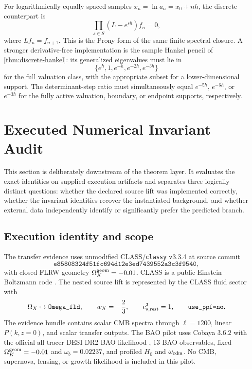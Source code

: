 \documentclass[aps,prd,preprint,onecolumn,nofootinbib,superscriptaddress,showkeys]{revtex4-2}
\numberwithin{equation}{section}
\theoremstyle{definition}
\theoremstyle{plain}
\begin{document}
For logarithmically equally spaced samples \(x_n=\ln a_n=x_0+nh\), the discrete counterpart is
\begin{equation}
\prod_{s\in S}(L-e^{sh})f_n=0,
\end{equation}
where \(Lf_n=f_{n+1}\).  This is the Prony form of the same finite spectral closure.  A stronger derivative-free implementation is the sample Hankel pencil of \cref{thm:discrete-hankel}: its generalized eigenvalues must lie in
\begin{equation}
\{e^{h},1,e^{-h},e^{-2h},e^{-3h}\}
\end{equation}
for the full valuation class, with the appropriate subset for a lower-dimensional support.  The determinant-step ratio must simultaneously equal \(e^{-5h}\), \(e^{-6h}\), or \(e^{-3h}\) for the fully active valuation, boundary, or endpoint supports, respectively.



\section{Executed Numerical Invariant Audit}\label{sec:executed-audit}

This section is deliberately downstream of the theorem layer.  It evaluates the exact identities on supplied execution artifacts and separates three logically distinct questions: whether the declared source lift was implemented correctly, whether the invariant identities recover the instantiated background, and whether external data independently identify or significantly prefer the predicted branch.

\subsection{Execution identity and scope}

The transfer evidence uses unmodified CLASS/\texttt{classy} v3.3.4 at source commit
\begin{equation}
\texttt{e85808324f51fc694d12e3ed7439552a3c3f9540},
\end{equation}
with closed FLRW geometry \(\Omega_K^{\rm geom}=-0.01\).  CLASS is a public Einstein--Boltzmann code \cite{Lesgourgues2011CLASS,BlasLesgourguesTram2011}.  The nested source lift is represented by the CLASS fluid sector with
\begin{equation}
\Omega_X\mapsto\texttt{Omega\_fld},
\qquad
w_X=-\frac23,
\qquad
c_{s,{\rm rest}}^2=1,
\qquad
\texttt{use\_ppf=no}.
\end{equation}
The evidence bundle contains scalar CMB spectra through \(\ell=1200\), linear \(P(k,z=0)\), and scalar transfer outputs.  The BAO pilot uses Cobaya 3.6.2 \cite{TorradoLewis2021} with the official all-tracer DESI DR2 BAO likelihood \cite{DESIDR2BAO2025}, 13 BAO observables, fixed \(\Omega_K^{\rm geom}=-0.01\) and \(\omega_b=0.02237\), and profiled \(H_0\) and \(\omega_{\rm cdm}\).  No CMB, supernova, lensing, or growth likelihood is included in this pilot.
\end{document}
